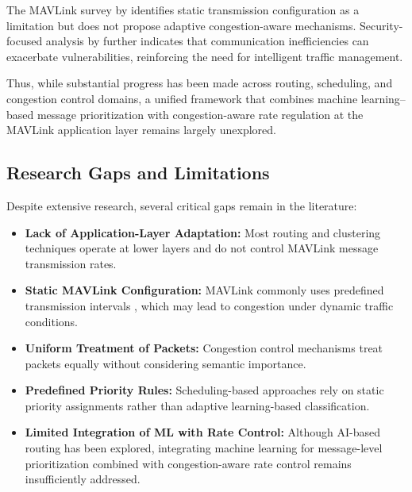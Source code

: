 \documentclass[pdflatex,sn-mathphys-num]{sn-jnl}%
\theoremstyle{thmstyleone}%
\theoremstyle{thmstyletwo}%
\theoremstyle{thmstylethree}%
\begin{document}
The MAVLink survey by \citet{koubaa2019micro} identifies static transmission configuration as a limitation but does not propose adaptive congestion-aware mechanisms. Security-focused analysis by \citet{cordill2025comprehensive} further indicates that communication inefficiencies can exacerbate vulnerabilities, reinforcing the need for intelligent traffic management.

Thus, while substantial progress has been made across routing, scheduling, and congestion control domains, a unified framework that combines machine learning–based message prioritization with congestion-aware rate regulation at the MAVLink application layer remains largely unexplored.

\subsection{Research Gaps and Limitations}

Despite extensive research, several critical gaps remain in the literature:

\begin{itemize}
    \item \textbf{Lack of Application-Layer Adaptation:} Most routing and clustering techniques \citep{zhang2022adaptive,yang2022improved} operate at lower layers and do not control MAVLink message transmission rates.
    
    \item \textbf{Static MAVLink Configuration:} MAVLink commonly uses predefined transmission intervals \citep{koubaa2019micro}, which may lead to congestion under dynamic traffic conditions.
    
    \item \textbf{Uniform Treatment of Packets:} Congestion control mechanisms \citep{grover2022rate,verma2024adaptive} treat packets equally without considering semantic importance.
    
    \item \textbf{Predefined Priority Rules:} Scheduling-based approaches \citep{li2018prioritizing,yang2025intelligent} rely on static priority assignments rather than adaptive learning-based classification.
    
    \item \textbf{Limited Integration of ML with Rate Control:} Although AI-based routing \citep{rovira2022review} has been explored, integrating machine learning for message-level prioritization combined with congestion-aware rate control remains insufficiently addressed.
\end{itemize}
\end{document}
